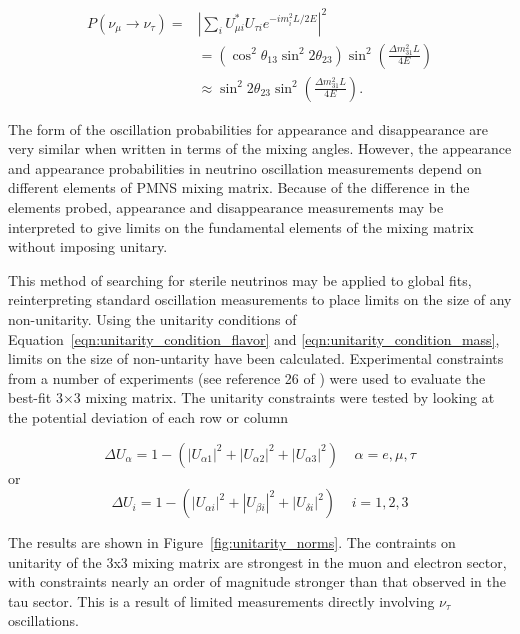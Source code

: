 \begin{equation}
\begin{aligned}
P\left(\nu_\mu\rightarrow\nu_\tau\right) {}= &  \left| \sum_i U^*_{\mu i} U_{\tau i} e^{-i m_i^2 L/2E} \right|^2 \\
 						&{}= \left( \cos^2 \theta_{13} \sin^2 2 \theta_{23} \right) \sin^2 \left( \frac{\Delta m^2_{31} L}{4 E} \right) \\
						&{}\approx \sin^2 2 \theta_{23} \sin^2 \left(\frac{\Delta m^2_{31} L}{4 E} \right).
\end{aligned}
\label{eqn:tau_appearance_probability}
\end{equation}

The form of the oscillation probabilities for appearance and disappearance are very similar when written in terms of the mixing angles.
However, the appearance and appearance probabilities in neutrino oscillation measurements depend on different elements of PMNS mixing matrix.
Because of the difference in the elements probed, appearance and disappearance measurements may be interpreted to give limits on the fundamental elements of the mixing matrix without imposing unitary.

This method of searching for sterile neutrinos may be applied to global fits, reinterpreting standard oscillation measurements to place limits on the size of any non-unitarity.
Using the unitarity conditions of Equation~\ref{eqn:unitarity_condition_flavor} and \ref{eqn:unitarity_condition_mass}, limits on the size of non-untarity have been calculated\cite{Parke-Unitarity}.
Experimental constraints from a number of experiments (see reference 26 of \cite{Parke-Unitarity}) were used to evaluate the best-fit 3$\times$3 mixing matrix.
The unitarity constraints were tested by looking at the potential deviation of each row or column

\begin{equation}
	\Delta U_{\alpha} = 1 - \left( \left| U_{\alpha 1} \right|^2 +\left| U_{\alpha 2} \right|^2 +\left| U_{\alpha 3} \right|^2 \right) \;\;\;\; \alpha=e, \mu, \tau
\label{eqn:unitarity_flavor_test}
\end{equation}
or 
\begin{equation}
	\Delta U_{i} = 1 - \left( \left| U_{\alpha i} \right|^2 + \left| U_{\beta i} \right|^2 + \left| U_{\delta i} \right|^2 \right) \;\;\;\; i=1, 2, 3
\label{eqn:unitarity_mass_test}
\end{equation}

The results are shown in Figure~\ref{fig:unitarity_norms}.
The contraints on unitarity of the 3x3 mixing matrix are strongest in the muon and electron sector, with constraints nearly an order of magnitude stronger than that observed in the tau sector.
This is a result of limited measurements directly involving $\nu_\tau$ oscillations.

